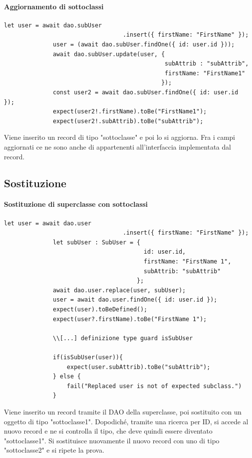 \documentclass[a4paper, 12pt]{report}
\begin{document}
          \paragraph{Aggiornamento di sottoclassi}
            \begin{Verbatim}[samepage=true]
              let user = await dao.subUser
                                  .insert({ firstName: "FirstName" });
              user = (await dao.subUser.findOne({ id: user.id }));
              await dao.subUser.update(user, { 
                                              subAttrib : "subAttrib",
                                              firstName: "FirstName1"
                                             });
              const user2 = await dao.subUser.findOne({ id: user.id });
              expect(user2!.firstName).toBe("FirstName1");
              expect(user2!.subAttrib).toBe("subAttrib");
            \end{Verbatim}
            Viene inserito un record di tipo "sottoclasse" e poi lo si aggiorna.
            Fra i campi aggiornati ce ne sono anche di appartenenti all'interfaccia implementata dal record.
          \newpage
        \subsection{Sostituzione}
          \paragraph{Sostituzione di superclasse con sottoclassi}
            \begin{Verbatim}[samepage=true]
              let user = await dao.user
                                  .insert({ firstName: "FirstName" });
              let subUser : SubUser = { 
                                        id: user.id,
                                        firstName: "FirstName 1",
                                        subAttrib: "subAttrib"
                                      };
              await dao.user.replace(user, subUser);
              user = await dao.user.findOne({ id: user.id });
              expect(user).toBeDefined();
              expect(user?.firstName).toBe("FirstName 1");

              \\[...] definizione type guard isSubUser
          
              if(isSubUser(user)){
                  expect(user.subAttrib).toBe("subAttrib");
              } else {
                  fail("Replaced user is not of expected subclass.")
              }
            \end{Verbatim}
            Viene inserito un record tramite il DAO della superclasse, poi sostituito con un oggetto di tipo "sottoclasse1".
            Dopodiché, tramite una ricerca per ID, si accede al nuovo record e ne si controlla il tipo, che deve quindi essere diventato "sottoclasse1".
            Si sostituisce nuovamente il nuovo record con uno di tipo "sottoclasse2" e si ripete la prova.
        \newpage
\end{document}
